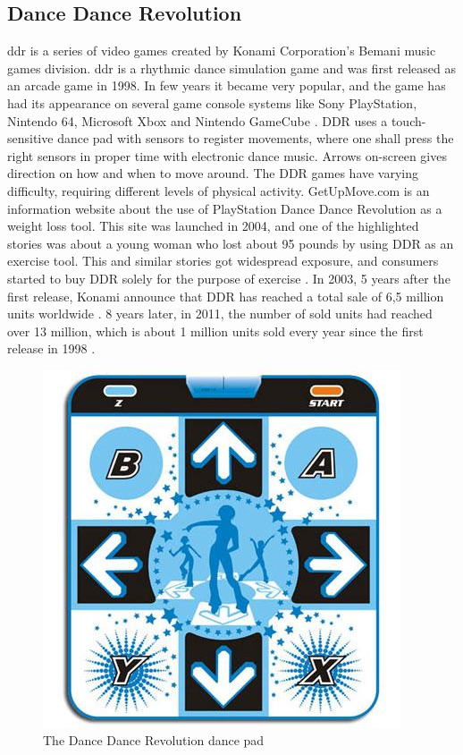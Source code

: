 \subsection{Dance Dance Revolution}
\ac{ddr} is a series of video games created by Konami Corporation’s Bemani music games division. \ac{ddr} is a rhythmic dance simulation game and was first released as an arcade game in 1998. In few years it became very popular, and the game has had its appearance on several game console systems like Sony PlayStation, Nintendo 64, Microsoft Xbox and Nintendo GameCube \cite{bogost2005rhetoric}. DDR uses a touch-sensitive dance pad with sensors to register movements, where one shall press the right sensors in proper time with electronic dance music. Arrows on-screen gives direction on how and when to move around. The DDR games have varying difficulty, requiring different levels of physical activity. GetUpMove.com is an information website about the use of PlayStation Dance Dance Revolution as a weight loss tool. This site was launched in 2004, and one of the highlighted stories was about a young woman who lost about 95 pounds by using DDR as an exercise tool. This and similar stories got widespread exposure, and consumers started to buy DDR solely for the purpose of exercise \cite{bogost2005rhetoric}. In 2003, 5 years after the first release, Konami announce that DDR has reached a total sale of 6,5 million units worldwide \cite{gamespot}. 8 years later, in 2011, the number of sold units had reached over 13 million, which is  about 1 million units sold every year since the first release in 1998 \cite{gaygamer}. 
\begin{figure}[h!]
\begin{center}
\includegraphics[scale=0.5]{ddrpad}
\caption[Dance Dance Revolution]{The Dance Dance Revolution dance pad}
\label{fig:DDRPad}
\end{center}
\end{figure}

